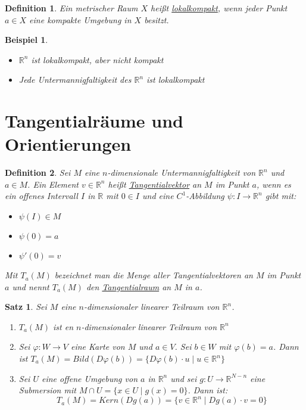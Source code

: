 \documentclass[10pt,a4paper]{report}
\newtheorem{satz}{Satz}
\newtheorem*{defi}{Definition}
\newtheorem*{example}{Beispiel}
\begin{document}
\begin{defi}
  Ein metrischer Raum $X$ heißt \underline{lokalkompakt}, wenn jeder Punkt $a \in X$ eine kompakte Umgebung in $X$ besitzt.
\end{defi}

\begin{example}
  \begin{itemize}
  \item $\mathbb{R}^{n}$ ist lokalkompakt, aber nicht kompakt
  \item Jede Untermannigfaltigkeit des $\mathbb{R}^{n}$ ist lokalkompakt
  \end{itemize}
\end{example}

\section{Tangentialräume und Orientierungen}

\begin{defi}
  Sei $M$ eine $n$-dimensionale Untermannigfaltigkeit von $\mathbb{R}^{n}$ und $a \in M$.
  Ein Element $v \in \mathbb{R}^{n}$ heißt \underline{Tangentialvektor} an $M$ im Punkt $a$, wenn es ein offenes Intervall $I$ in $\mathbb{R}$ mit $0 \in I$ und eine $C^{1}$-Abbildung $\psi : I \rightarrow \mathbb{R}^{n}$ gibt mit:
  \begin{itemize}
    \item $\psi(I) \in M$
    \item $\psi(0) = a$
    \item $\psi'(0) = v$
  \end{itemize}
  Mit $T_{a}(M)$ bezeichnet man die Menge aller Tangentialvektoren an $M$ im Punkt $a$ und nennt $T_{a}(M)$ den \underline{Tangentialraum} an $M$ in $a$.
\end{defi}

\begin{satz}
  Sei $M$ eine $n$-dimensionaler linearer Teilraum von $\mathbb{R}^{n}$.
  \begin{enumerate}[label={\alph*)}]
    \item $T_{a}(M)$ ist en $n$-dimensionaler linearer Teilraum von $\mathbb{R}^{n}$
    \item Sei $\varphi : W \rightarrow V$ eine Karte von $M$ und $a \in V$. Sei $b \in W$ mit $\varphi(b) = a$. Dann ist $T_{a}(M) = Bild(D\varphi(b)) = \{ D\varphi(b) \cdot u \mid u \in \mathbb{R}^{n} \}$
    \item Sei $U$ eine offene Umgebung von $a$ in $\mathbb{R}^{n}$ und sei $g : U \rightarrow \mathbb{R}^{N - n}$ eine Submersion mit $M \cap U = \{ x \in U \mid g(x) = 0 \}$.
      Dann ist:
      \begin{equation}
        T_{a}(M) = Kern(Dg(a)) = \{ v \in \mathbb{R}^{n} \mid Dg(a) \cdot v = 0 \}
      \end{equation}
  \end{enumerate}
\end{satz}
\end{document}
